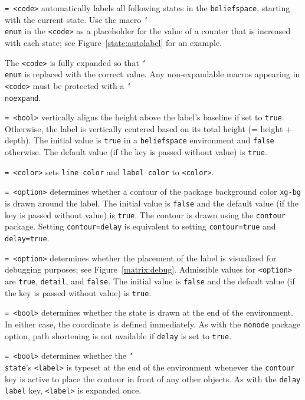 \documentclass{article}
\newenvironment{desc}{\itemize[leftmargin=50pt]}{\enditemize}
\def\option#1#2{\item[\texttt{#1}] \hskip-1.5pt\texttt{#2}}
\renewcommand{\textbackslash}{\char`\\}
\def\cmd#1{\texttt{\color{cmd}\textbackslash#1}}
\begin{document}
\begin{desc}
\option{autolabel}{= <code>} automatically labels all following states in the \texttt{beliefspace}, starting with the current state. Use the macro \cmd{enum} in the \texttt{<code>} as a placeholder for the value of a counter that is increased with each state; see Figure~\ref{state:autolabel} for an example.

{\color{player4}The \texttt{<code>} is fully expanded so that \cmd{enum} is replaced with the correct value. Any non-expandable macros appearing in \texttt{<code>} must be protected with a \cmd{noexpand}.}

\option{base line}{= <bool>} vertically aligns the height above the label's baseline if set to \texttt{true}. Otherwise, the label is vertically centered based on its total height (= height + depth). The initial value is \texttt{true} in a \texttt{beliefspace} environment and \texttt{false} otherwise. The default value (if the key is passed without value) is \texttt{true}.

\option{color}{= <color>} sets \texttt{line color} and \texttt{label color} to \texttt{<color>}.

\option{contour}{= <option>} determines whether a contour of the package background color \texttt{xg-bg} is drawn around the label. The initial value is \texttt{false} and the default value (if the key is passed without value) is \texttt{true}. The contour is drawn using the \texttt{contour} package. Setting \texttt{contour=delay} is equivalent to setting \texttt{contour=true} and \texttt{delay=true}.

\option{debug}{= <option>} determines whether the placement of the label is visualized for debugging purposes; see Figure~\ref{matrix:debug}. Admissible values for \texttt{<option>} are \texttt{true}, \texttt{detail}, and \texttt{false}. The initial value is \texttt{false} and the default value (if the key is passed without value) is \texttt{true}.

\option{delay}{= <bool>} determines whether the state is drawn at the end of the environment. In either case, the coordinate is defined immediately. As with the \texttt{nonode} package option, path shortening is not available if \texttt{delay} is set to \texttt{true}. 

\option{delay contour}{= <bool>} determines whether the \cmd{state}'s \texttt{<label>} is typeset at the end of the environment whenever the \texttt{contour} key is active to place the contour in front of any other objects. As with the \texttt{delay label} key, \texttt{<label>} is expanded once.


\end{desc}
\end{document}
